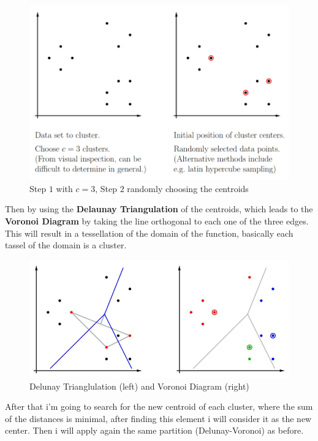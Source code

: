 \documentclass{article}
\begin{document}
\begin{figure}[H]
    \centering
    \includegraphics[scale=0.4]{images/c-means.png}
    \caption{Step $1$ with $c=3$, Step $2$ randomly choosing the centroids}
\end{figure}
Then by using the \textbf{Delaunay Triangulation} of the centroids, which leads
to the \textbf{Voronoi Diagram} by taking the line orthogonal to each one of the three
edges. This will result in a tessellation of the domain of the function, basically
each tassel of the domain is a cluster.
\begin{figure}[H]
    \centering
    \includegraphics[scale=0.4]{images/c-means1.png}
    \caption{Delunay Trianglulation (left) and Voronoi Diagram (right)}
\end{figure}
After that i'm going to search for the new centroid of each cluster, where the sum of the
distances is minimal, after finding this element i will consider it as the new center.
Then i will apply again the same partition (Delunay-Voronoi) as before.
\end{document}
